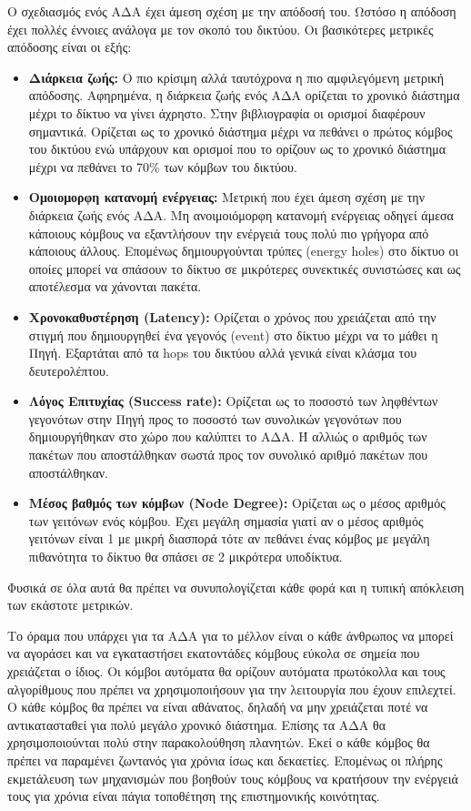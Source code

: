 Ο σχεδιασμός ενός ΑΔΑ έχει άμεση σχέση με την απόδοσή του. Ωστόσο η απόδοση έχει πολλές έννοιες ανάλογα με τον σκοπό του δικτύου. Οι βασικότερες μετρικές απόδοσης
είναι οι εξής:
\begin{itemize}
\item \textbf{Διάρκεια ζωής:} Ο πιο κρίσιμη αλλά ταυτόχρονα η πιο αμφιλεγόμενη μετρική απόδοσης. Αφηρημένα, η διάρκεια ζωής ενός ΑΔΑ ορίζεται το χρονικό διάστημα
μέχρι το δίκτυο να γίνει άχρηστο.
Στην βιβλιογραφία οι ορισμοί διαφέρουν σημαντικά.
Ορίζεται ως το χρονικό διάστημα μέχρι να πεθάνει ο πρώτος κόμβος του δικτύου ενώ υπάρχουν και ορισμοί που το ορίζουν ως το χρονικό διάστημα μέχρι να πεθάνει το 70\%
των κόμβων του δικτύου.
\item \textbf{Ομοιομορφη κατανομή ενέργειας:} Μετρική που έχει άμεση σχέση με την διάρκεια ζωής ενός ΑΔΑ.
Μη ανοιμοιόμορφη κατανομή ενέργειας οδηγεί άμεσα κάποιους κόμβους να εξαντλήσουν την ενέργειά τους πολύ πιο γρήγορα από κάποιους άλλους.
Επομένως δημιουργούνται τρύπες (energy holes) στο δίκτυο οι οποίες μπορεί να σπάσουν το δίκτυο σε μικρότερες συνεκτικές συνιστώσες και ως αποτέλεσμα να χάνονται
πακέτα.
\item \textbf{Χρονοκαθυστέρηση (Latency):} Ορίζεται ο χρόνος που χρειάζεται από την στιγμή που δημιουργηθεί ένα γεγονός (event) στο δίκτυο μέχρι να το μάθει η Πηγή.
Εξαρτάται από τα hops του δικτύου αλλά γενικά είναι κλάσμα του δευτερολέπτου.
\item \textbf{Λόγος Επιτυχίας (Success rate):} Ορίζεται ως το ποσοστό των ληφθέντων γεγονότων στην Πηγή προς το ποσοστό των συνολικών γεγονότων που δημιουργήθηκαν στο
χώρο που καλύπτει
το ΑΔΑ.
Ή αλλιώς ο αριθμός των πακέτων που αποστάλθηκαν σωστά προς τον συνολικό αριθμό πακέτων που αποστάλθηκαν.
\item \textbf{Μέσος βαθμός των κόμβων (Node Degree):} Ορίζεται ως ο μέσος αριθμός των γειτόνων ενός κόμβου.
Έχει μεγάλη σημασία γιατί αν ο μέσος αριθμός γειτόνων είναι 1 με μικρή διασπορά τότε αν πεθάνει ένας κόμβος με μεγάλη πιθανότητα το δίκτυο θα σπάσει σε 2 μικρότερα
υποδίκτυα.
\end{itemize}
Φυσικά σε όλα αυτά θα πρέπει να συνυπολογίζεται κάθε φορά και η τυπική απόκλειση των εκάστοτε μετρικών.

Το όραμα που υπάρχει για τα ΑΔΑ για το μέλλον είναι ο κάθε άνθρωπος να μπορεί να αγοράσει και να εγκαταστήσει εκατοντάδες κόμβους εύκολα σε σημεία που χρειάζεται ο
ίδιος.
Οι κόμβοι αυτόματα θα ορίζουν αυτόματα πρωτόκολλα και τους αλγορίθμους που πρέπει να χρησιμοποιήσουν για την λειτουργία που έχουν επιλεχτεί.
Ο κάθε κόμβος θα πρέπει να είναι αθάνατος, δηλαδή να μην χρειάζεται ποτέ να αντικατασταθεί για πολύ μεγάλο χρονικό διάστημα.
Επίσης τα ΑΔΑ θα χρησιμοποιούνται πολύ στην παρακολούθηση πλανητών.
Εκεί ο κάθε κόμβος θα πρέπει να παραμένει ζωντανός για χρόνια ίσως και δεκαετίες.
Επομένως οι πλήρης εκμετάλευση των μηχανισμών που βοηθούν τους κόμβους να κρατήσουν την ενέργειά τους για χρόνια είναι πάγια τοποθέτηση της επιστημονικής κοινότητας.
